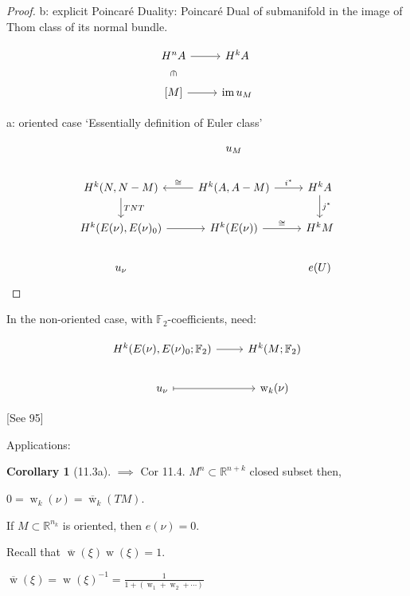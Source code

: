 \documentclass{article}
\theoremstyle{definition}
\newtheorem{corollary}[theorem]{Corollary}
\begin{document}
    \begin{proof}
        b: explicit Poincar\'e Duality: Poincar\'e Dual of submanifold in the image of Thom class of its normal bundle.

        \[
            \begin{tikzcd}
                H^n A \ar[r] \ar[d,"\in",sloped,phantom] & H^k A \\
                {[M]} \ar[r] & \operatorname{im} u_M 
            \end{tikzcd}
        \]

        a: oriented case `Essentially definition of Euler class'

        \[
            \begin{tikzcd}
                & u_M \\
                H^k(N, N-M) \ar[d,"TNT"] & H^k(A , A - M) \ar[l, "\cong"'] \ar[r,"i^{\ast}"] & H^k A \ar[d,"j^{\ast}"] \\
                H^k(E(\nu) , E(\nu)_0) \ar[r] & H^k(E(\nu)) \ar[r,"\cong"] & H^k M \\
                u_\nu & & e(U)
            \end{tikzcd}
        \]

    \end{proof}

    In the non-oriented case, with \(\mathbb{F}_2\)-coefficients, need:

    \[
        \begin{tikzcd}
            H^k(E(\nu), E(\nu)_0 ; \mathbb{F}_2) \ar[r] & H^k(M;\mathbb{F}_2) \\
            u_\nu \ar[r,mapsto] & \operatorname{w}_k(\nu)
        \end{tikzcd}
    \]

    [See 95]

    Applications: 

    \begin{corollary}
        [11.3a] \(\implies\) Cor 11.4. \(M^n \subset \mathbb{R}^{n+k}\) closed subset then,
        
        \(0 = \operatorname{w}_k(\nu) = \overline{\operatorname{w}}_k(TM)\).

        If \(M \subset \mathbb{R}^{n_k}\) is oriented, then \(e(\nu) = 0\).
    \end{corollary}

    Recall that \(\overline{\operatorname{w}}(\xi) \operatorname{w}(\xi) = 1\).

    \(\overline{\operatorname{w}}(\xi) = \operatorname{w}(\xi) ^{-1} = \frac{1}{1 + (\operatorname{w}_1 + \operatorname{w}_2 + \cdots)}\)
    
\end{document}
